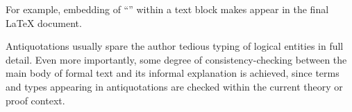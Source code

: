 \begin{isabellebody}
\begin{isamarkuptext}
  For example, embedding of ``''
  within a text block makes
   appear in the final {\LaTeX} document.

  Antiquotations usually spare the author tedious typing of logical
  entities in full detail.  Even more importantly, some degree of
  consistency-checking between the main body of formal text and its
  informal explanation is achieved, since terms and types appearing in
  antiquotations are checked within the current theory or proof
  context.


\end{isamarkuptext}
\end{isabellebody}
